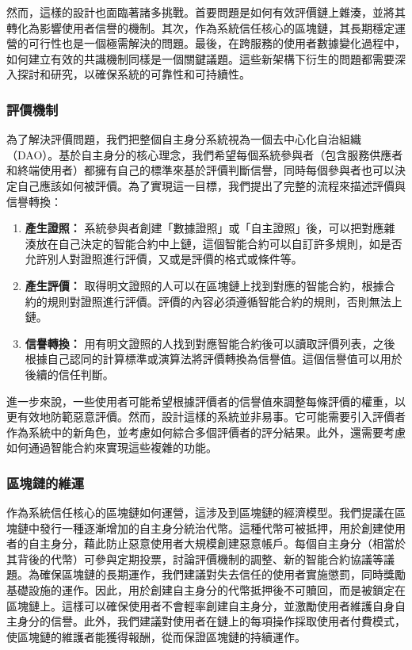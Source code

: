 然而，這樣的設計也面臨著諸多挑戰。首要問題是如何有效評價鏈上雜湊，並將其轉化為影響使用者信譽的機制。其次，作為系統信任核心的區塊鏈，其長期穩定運營的可行性也是一個極需解決的問題。最後，在跨服務的使用者數據變化過程中，如何建立有效的共識機制同樣是一個關鍵議題。這些新架構下衍生的問題都需要深入探討和研究，以確保系統的可靠性和可持續性。
\subsubsection{評價機制}
為了解決評價問題，我們把整個自主身分系統視為一個去中心化自治組織（DAO）。基於自主身分的核心理念，我們希望每個系統參與者（包含服務供應者和終端使用者）都擁有自己的標準來基於評價判斷信譽，同時每個參與者也可以決定自己應該如何被評價。為了實現這一目標，我們提出了完整的流程來描述評價與信譽轉換：
\begin{enumerate}
  \item \textbf{產生證照：} 系統參與者創建「數據證照」或「自主證照」後，可以把對應雜湊放在自己決定的智能合約中上鏈，這個智能合約可以自訂許多規則，如是否允許別人對證照進行評價，又或是評價的格式或條件等。
  \item \textbf{產生評價：} 取得明文證照的人可以在區塊鏈上找到對應的智能合約，根據合約的規則對證照進行評價。評價的內容必須遵循智能合約的規則，否則無法上鏈。
  \item \textbf{信譽轉換：} 用有明文證照的人找到對應智能合約後可以讀取評價列表，之後根據自己認同的計算標準或演算法將評價轉換為信譽值。這個信譽值可以用於後續的信任判斷。
\end{enumerate}
進一步來說，一些使用者可能希望根據評價者的信譽值來調整每條評價的權重，以更有效地防範惡意評價。然而，設計這樣的系統並非易事。它可能需要引入評價者作為系統中的新角色，並考慮如何綜合多個評價者的評分結果\cite{josang2006exploring}。此外，還需要考慮如何通過智能合約來實現這些複雜的功能。
\subsubsection{區塊鏈的維運}
作為系統信任核心的區塊鏈如何運營，這涉及到區塊鏈的經濟模型。我們提議在區塊鏈中發行一種逐漸增加的自主身分統治代幣。這種代幣可被抵押，用於創建使用者的自主身分，藉此防止惡意使用者大規模創建惡意帳戶。每個自主身分（相當於其背後的代幣）可參與定期投票，討論評價機制的調整、新的智能合約協議等議題。為確保區塊鏈的長期運作，我們建議對失去信任的使用者實施懲罰，同時獎勵基礎設施的運作。因此，用於創建自主身分的代幣抵押後不可贖回，而是被鎖定在區塊鏈上。這樣可以確保使用者不會輕率創建自主身分，並激勵使用者維護自身自主身分的信譽。此外，我們建議對使用者在鏈上的每項操作採取使用者付費模式，使區塊鏈的維護者能獲得報酬，從而保證區塊鏈的持續運作。

